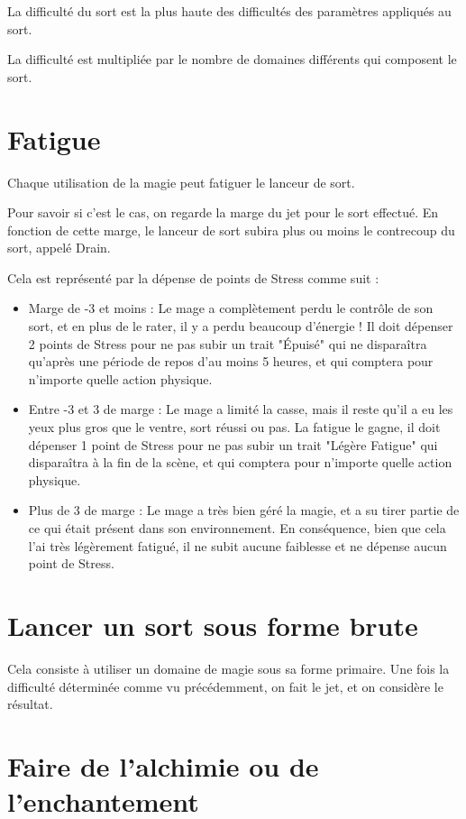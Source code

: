 La difficulté du sort est la plus haute des difficultés des paramètres appliqués au sort.

La difficulté est multipliée par le nombre de domaines différents qui composent le sort.

\section{Fatigue}

Chaque utilisation de la magie peut fatiguer le lanceur de sort.

Pour savoir si c'est le cas, on regarde la marge du jet pour le sort effectué. En fonction de cette marge, le lanceur de sort subira plus ou moins le contrecoup du sort, appelé Drain.

Cela est représenté par la dépense de points de Stress comme suit :

\begin{itemize}
\item
Marge de -3 et moins : Le mage a complètement perdu le contrôle de son sort, et en plus de le rater, il y a perdu beaucoup d'énergie ! Il doit dépenser 2 points de Stress pour ne pas subir un trait "Épuisé" qui ne disparaîtra qu'après une période de repos d'au moins 5 heures, et qui comptera pour n'importe quelle action physique.
\item
Entre -3 et 3 de marge : Le mage a limité la casse, mais il reste qu'il a eu les yeux plus gros que le ventre, sort réussi ou pas. La fatigue le gagne, il doit dépenser 1 point de Stress pour ne pas subir un trait "Légère Fatigue" qui disparaîtra à la fin de la scène, et qui comptera pour n'importe quelle action physique.
\item
Plus de 3 de marge : Le mage a très bien géré la magie, et a su tirer partie de ce qui était présent dans son environnement. En conséquence, bien que cela l'ai très légèrement fatigué, il ne subit aucune faiblesse et ne dépense aucun point de Stress.
\end{itemize}

\section{Lancer un sort sous forme brute}

Cela consiste à utiliser un domaine de magie sous sa forme primaire. Une fois la difficulté déterminée comme vu précédemment, on fait le jet, et on considère le résultat.

\section{Faire de l'alchimie ou de l'enchantement}

